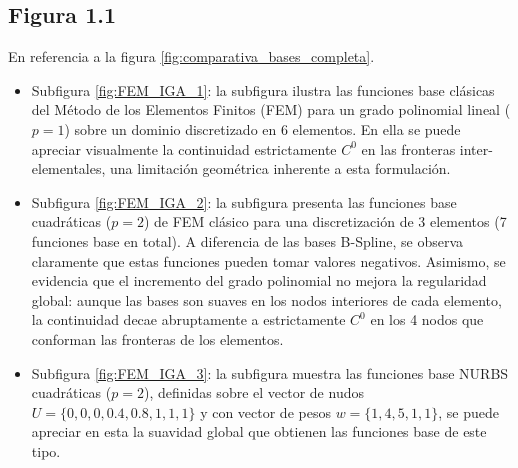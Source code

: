 \documentclass[11pt]{book}
\theoremstyle{plain} %
\theoremstyle{definition} %
\theoremstyle{definition} %
\begin{document}
\subsection{Figura 1.1}\label{exp_fig1.1}
En referencia a la figura \ref{fig:comparativa_bases_completa}.
\begin{itemize}

    \item Subfigura \ref{fig:FEM_IGA_1}: la subfigura ilustra las funciones base clásicas del Método de los Elementos Finitos (FEM) para un grado polinomial lineal ($p=1$) sobre un dominio discretizado en $6$ elementos. En ella se puede apreciar visualmente la continuidad estrictamente $C^0$ en las fronteras inter-elementales, una limitación geométrica inherente a esta formulación.

    \item Subfigura \ref{fig:FEM_IGA_2}: la subfigura presenta las funciones base cuadráticas ($p=2$) de FEM clásico para una discretización de 3 elementos (7 funciones base en total). A diferencia de las bases B-Spline, se observa claramente que estas funciones pueden tomar valores negativos. Asimismo, se evidencia que el incremento del grado polinomial no mejora la regularidad global: aunque las bases son suaves en los nodos interiores de cada elemento, la continuidad decae abruptamente a estrictamente $C^0$ en los 4 nodos que conforman las fronteras de los elementos.

    \item Subfigura \ref{fig:FEM_IGA_3}: la subfigura muestra las funciones base NURBS cuadráticas ($p=2$), definidas sobre el vector de nudos $U = \{0, 0, 0, 0.4, 0.8, 1, 1, 1\}$ y con vector de pesos $w = \{1, 4, 5, 1, 1\}$, se puede apreciar en esta la suavidad global que obtienen las funciones base de este tipo.
    
\end{itemize}


\end{document}
